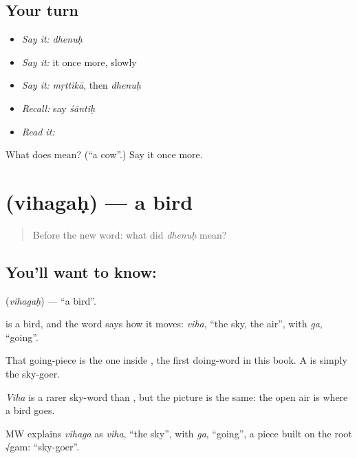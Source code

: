\subsection*{Your turn}
\begin{itemize}
\raggedright
  \item \emph{Say it:} \emph{dhenuḥ}
  \item \emph{Say it:} it once more, slowly
  \item \emph{Say it:} \emph{mṛttikā}, then \emph{dhenuḥ}
  \item \emph{Recall:} say \emph{śāntiḥ}
  \item \emph{Read it:} \textbf{}
\end{itemize}

\begin{tcolorbox}[breakable,colback=teal!4,colframe=teal!35!black,title={Before you move on}]
What does  mean? (\textquotedblleft{}a cow\textquotedblright{}.) Say it once more.
\end{tcolorbox}
\section[\texorpdfstring{\sk{विहगः} (vihagaḥ)}{विहगः (vihagaḥ)}]{ (vihagaḥ) — a bird}

\label{lesson:SA-C39-bird}



\begin{quote}
Before the new word: what did \emph{dhenuḥ} mean?
\end{quote}

\subsection*{You'll want to know: }
\textbf{} (\emph{vihagaḥ}) — \textquotedblleft{}a bird\textquotedblright{}.

\textbf{} is a bird, and the word says how it moves: \emph{viha}, \textquotedblleft{}the sky, the air\textquotedblright{}, with \emph{ga}, \textquotedblleft{}going\textquotedblright{}.

That going-piece is the one inside , the first doing-word in this book. A \textbf{} is simply the sky-goer.

\emph{Viha} is a rarer sky-word than , but the picture is the same: the open air is where a bird goes.

\begin{cousinweb}
MW explains \emph{vihaga} as \emph{viha}, \textquotedblleft{}the sky\textquotedblright{}, with \emph{ga}, \textquotedblleft{}going\textquotedblright{}, a piece built on the root √gam: \textquotedblleft{}sky-goer\textquotedblright{}.
\end{cousinweb}

